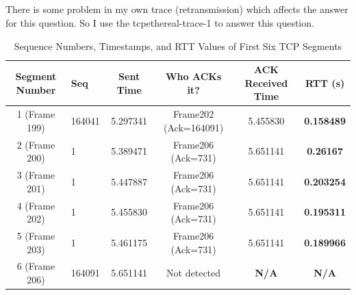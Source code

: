 \documentclass{article}
\begin{document}
\begin{CJK*}{UTF8}{gbsn}
\subsection{}
There is some problem in my own trace (retransmission) which affects the answer
for this question. So I use the tcpethereal-trace-1 to answer this question.
\begin{table}[h]
    \centering
    \begin{tabular}{clcccc}
        \toprule
        \textbf{Segment Number} & 
        \textbf{Seq} & 
        \textbf{Sent Time} & 
        \textbf{Who ACKs it?} & 
        \textbf{ACK Received Time} & 
        \textbf{RTT (s)} \\
        \midrule
        1 (Frame 199) & 164041 & 5.297341 & Frame202 (Ack=164091)& 5.455830 & \textbf{0.158489} \\
        2 (Frame 200)& 1 & 5.389471 & 	Frame206 (Ack=731)& 5.651141 & \textbf{0.26167} \\
        3 (Frame 201) & 1 & 5.447887 & 	Frame206 (Ack=731)& 5.651141 & \textbf{0.203254} \\
        4 (Frame 202) & 1 & 5.455830 & Frame206 (Ack=731)& 5.651141	 & \textbf{0.195311} \\
        5 (Frame 203) & 1 & 5.461175 & Frame206 (Ack=731)& 5.651141	 & \textbf{0.189966} \\
        6 (Frame 206) & 164091 & 5.651141 & Not detected & \textbf{N/A} & \textbf{N/A} \\
        \bottomrule
    \end{tabular}
    \caption{Sequence Numbers, Timestamps, and RTT Values of First Six TCP Segments}
    \label{tab:rtt_values}
\end{table}


\end{CJK*}
\end{document}
